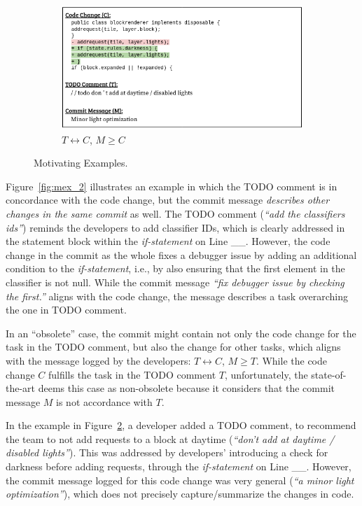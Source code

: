 \begin{figure}[t]
\begin{subfigure}{.45\textwidth}
		\includegraphics[width=\textwidth]{images/mex_3.png}
		\caption{$T \leftrightarrow C$, $M \geq C$}
		\label{fig:mex_3}
	\end{subfigure}
\caption{Motivating Examples.}
\end{figure}

Figure~\ref{fig:mex_2} illustrates an example in which the TODO
comment is in concordance with the code change, but the commit message
{\em describes other changes in the same commit} as well. The TODO
comment ({\em ``add the classifiers ids''}) reminds the developers to
add classifier IDs, which is clearly addressed in the statement block
within the {\em if-statement} on Line \_\_. However, the code change
in the commit as the whole fixes a debugger issue by adding an
additional condition to the {\em if-statement}, i.e., by also ensuring
that the first element in the classifier is not null. While the commit
message {\em ``fix debugger issue by checking the first.''} aligns
with the code change, the message describes a task overarching the one
in TODO comment.

  In an ``obsolete'' case, the commit
might contain not only the code change for the task in the TODO
comment, but also the change for other tasks, which aligns with the
message logged by the developers: $T \leftrightarrow C$, $M \geq
T$. While the code change $C$ fulfills the task in the TODO comment
$T$, unfortunately, the state-of-the-art \tdcleaner deems this
case as non-obsolete because it considers that the commit message $M$
is not accordance with $T$.

In the example in Figure~\ref{fig:mex_3}, a developer added a TODO
comment, to recommend the team to not add requests to a block at
daytime ({\em ``don't add at daytime / disabled lights''}). This was
addressed by developers' introducing a check for darkness before
adding requests, through the {\em if-statement} on Line \_\_.
However, the commit message logged for this code change was very
general ({\em ``a minor light optimization''}), which does not
precisely capture/summarize the changes in code.

